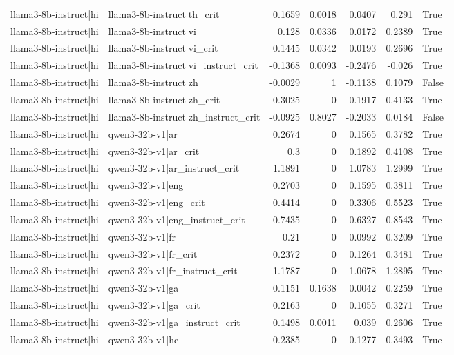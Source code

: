 \begin{table}
\begin{tabular}{l l r r r r l}
llama3-8b-instruct|hi & llama3-8b-instruct|th_crit & 0.1659 & 0.0018 & 0.0407 & 0.291 & True \\
llama3-8b-instruct|hi & llama3-8b-instruct|vi & 0.128 & 0.0336 & 0.0172 & 0.2389 & True \\
llama3-8b-instruct|hi & llama3-8b-instruct|vi_crit & 0.1445 & 0.0342 & 0.0193 & 0.2696 & True \\
llama3-8b-instruct|hi & llama3-8b-instruct|vi_instruct_crit & -0.1368 & 0.0093 & -0.2476 & -0.026 & True \\
llama3-8b-instruct|hi & llama3-8b-instruct|zh & -0.0029 & 1 & -0.1138 & 0.1079 & False \\
llama3-8b-instruct|hi & llama3-8b-instruct|zh_crit & 0.3025 & 0 & 0.1917 & 0.4133 & True \\
llama3-8b-instruct|hi & llama3-8b-instruct|zh_instruct_crit & -0.0925 & 0.8027 & -0.2033 & 0.0184 & False \\
llama3-8b-instruct|hi & qwen3-32b-v1|ar & 0.2674 & 0 & 0.1565 & 0.3782 & True \\
llama3-8b-instruct|hi & qwen3-32b-v1|ar_crit & 0.3 & 0 & 0.1892 & 0.4108 & True \\
llama3-8b-instruct|hi & qwen3-32b-v1|ar_instruct_crit & 1.1891 & 0 & 1.0783 & 1.2999 & True \\
llama3-8b-instruct|hi & qwen3-32b-v1|eng & 0.2703 & 0 & 0.1595 & 0.3811 & True \\
llama3-8b-instruct|hi & qwen3-32b-v1|eng_crit & 0.4414 & 0 & 0.3306 & 0.5523 & True \\
llama3-8b-instruct|hi & qwen3-32b-v1|eng_instruct_crit & 0.7435 & 0 & 0.6327 & 0.8543 & True \\
llama3-8b-instruct|hi & qwen3-32b-v1|fr & 0.21 & 0 & 0.0992 & 0.3209 & True \\
llama3-8b-instruct|hi & qwen3-32b-v1|fr_crit & 0.2372 & 0 & 0.1264 & 0.3481 & True \\
llama3-8b-instruct|hi & qwen3-32b-v1|fr_instruct_crit & 1.1787 & 0 & 1.0678 & 1.2895 & True \\
llama3-8b-instruct|hi & qwen3-32b-v1|ga & 0.1151 & 0.1638 & 0.0042 & 0.2259 & True \\
llama3-8b-instruct|hi & qwen3-32b-v1|ga_crit & 0.2163 & 0 & 0.1055 & 0.3271 & True \\
llama3-8b-instruct|hi & qwen3-32b-v1|ga_instruct_crit & 0.1498 & 0.0011 & 0.039 & 0.2606 & True \\
llama3-8b-instruct|hi & qwen3-32b-v1|he & 0.2385 & 0 & 0.1277 & 0.3493 & True \\

\end{tabular}
\end{table}
